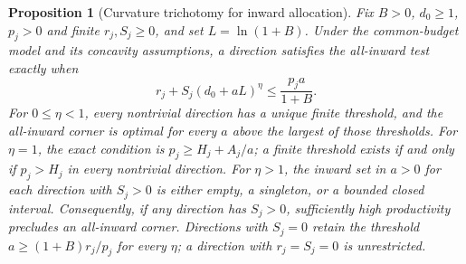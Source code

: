 \documentclass[11pt,a4paper]{article}
\newtheorem{proposition}{Proposition}
\theoremstyle{definition}\newtheorem{definition}{Definition}
\begin{document}
\begin{proposition}[Curvature trichotomy for inward allocation]
\label{prop:curvature}
Fix $B>0$, $d_0\geq1$, $p_j>0$ and finite $r_j,S_j\geq0$, and set
$L=\ln(1+B)$. Under the common-budget model and its concavity
assumptions, a direction satisfies the all-inward test exactly when
\begin{equation}
 r_j+S_j(d_0+aL)^\eta\leq\frac{p_j a}{1+B}.
 \label{eq:iso-corner}
\end{equation}
For $0\leq\eta<1$, every nontrivial direction has a unique finite
threshold, and the all-inward corner is optimal for every $a$ above the
largest of those thresholds. For $\eta=1$, the exact condition is
$p_j\geq H_j+A_j/a$; a finite threshold exists if and only if
$p_j>H_j$ in every nontrivial direction. For $\eta>1$, the inward set
in $a>0$ for each direction with $S_j>0$ is either empty, a singleton,
or a bounded closed interval. Consequently, if any direction has
$S_j>0$, sufficiently high productivity precludes an all-inward corner.
Directions with $S_j=0$ retain the threshold
$a\geq(1+B)r_j/p_j$ for every $\eta$; a direction with $r_j=S_j=0$
is unrestricted.
\end{proposition}
\end{document}
